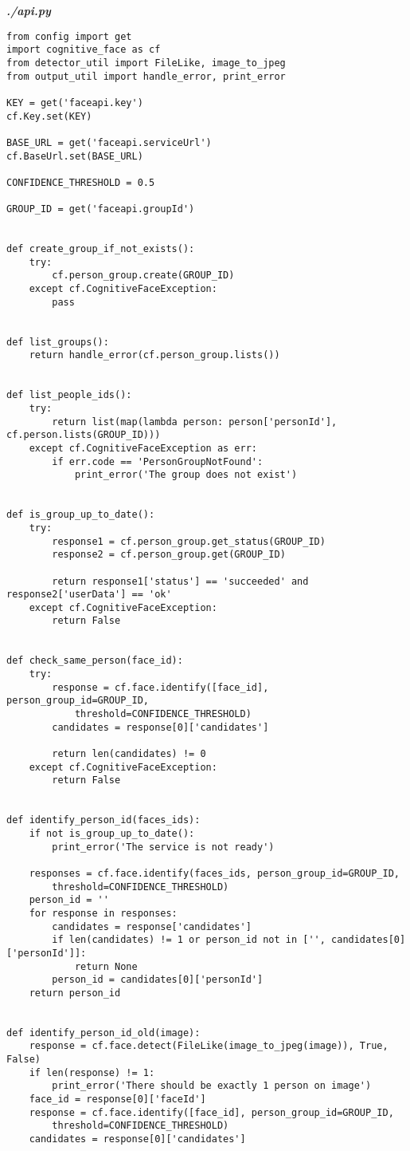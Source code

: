 \textit{\textbf{./api.py}}
\begin{verbatim}
from config import get
import cognitive_face as cf
from detector_util import FileLike, image_to_jpeg
from output_util import handle_error, print_error

KEY = get('faceapi.key')
cf.Key.set(KEY)

BASE_URL = get('faceapi.serviceUrl')
cf.BaseUrl.set(BASE_URL)

CONFIDENCE_THRESHOLD = 0.5

GROUP_ID = get('faceapi.groupId')


def create_group_if_not_exists():
    try:
        cf.person_group.create(GROUP_ID)
    except cf.CognitiveFaceException:
        pass


def list_groups():
    return handle_error(cf.person_group.lists())


def list_people_ids():
    try:
        return list(map(lambda person: person['personId'], cf.person.lists(GROUP_ID)))
    except cf.CognitiveFaceException as err:
        if err.code == 'PersonGroupNotFound':
            print_error('The group does not exist')


def is_group_up_to_date():
    try:
        response1 = cf.person_group.get_status(GROUP_ID)
        response2 = cf.person_group.get(GROUP_ID)

        return response1['status'] == 'succeeded' and response2['userData'] == 'ok'
    except cf.CognitiveFaceException:
        return False


def check_same_person(face_id):
    try:
        response = cf.face.identify([face_id], person_group_id=GROUP_ID, 
            threshold=CONFIDENCE_THRESHOLD)
        candidates = response[0]['candidates']

        return len(candidates) != 0
    except cf.CognitiveFaceException:
        return False


def identify_person_id(faces_ids):
    if not is_group_up_to_date():
        print_error('The service is not ready')

    responses = cf.face.identify(faces_ids, person_group_id=GROUP_ID, 
        threshold=CONFIDENCE_THRESHOLD)
    person_id = ''
    for response in responses:
        candidates = response['candidates']
        if len(candidates) != 1 or person_id not in ['', candidates[0]['personId']]:
            return None
        person_id = candidates[0]['personId']
    return person_id


def identify_person_id_old(image):
    response = cf.face.detect(FileLike(image_to_jpeg(image)), True, False)
    if len(response) != 1:
        print_error('There should be exactly 1 person on image')
    face_id = response[0]['faceId']
    response = cf.face.identify([face_id], person_group_id=GROUP_ID, 
        threshold=CONFIDENCE_THRESHOLD)
    candidates = response[0]['candidates']


\end{verbatim}
